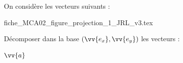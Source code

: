 \finEntrainement


















\hauteurLargeurCadreReponse		{8mm}{6cm}
\initialisationEntrainement

On considère les vecteurs suivants : 
\begin{center}
{fiche_MCA02_figure_projection_1_JRL_v3.tex}
\end{center}

\vspace{-0.75cm}

Décomposer dans la base $(\vv{e_x}, \vv{e_y})$ les vecteurs :

\debutEntrainement



\begin{enonce}
	$\vv{a}$
\end{enonce}


